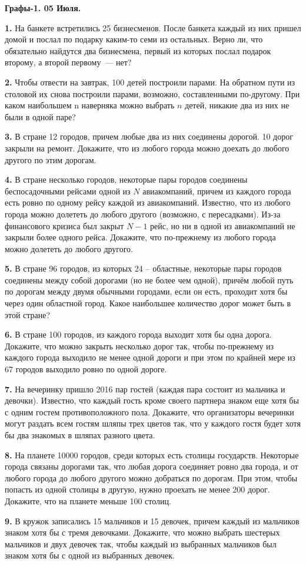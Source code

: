 \begin{center}
\Large

\textbf{Графы-1. 05 Июля.}
\end{center}  

\large
\def\q#1.{{\smallskip\bf #1.}}

\q1. На банкете встретились 25 бизнесменов. После банкета каждый из
них пришел домой и послал по подарку каким-то семи из остальных.
Верно ли, что обязательно найдутся два бизнесмена, первый из которых
послал подарок второму, а второй первому~--- нет?


\q2. Чтобы отвести на завтрак, 100 детей построили парами. На обратном 
пути из столовой их снова построили парами, возможно, составленными по-другому. 
При каком наибольшем n наверняка можно выбрать $n$ 
детей, никакие два из них не были в одной паре?

\q3. В стране 12 городов, причем любые два из них соединены дорогой.
10 дорог закрыли на ремонт. Докажите, что из любого города можно
доехать до любого другого по этим дорогам.

\q4. В стране несколько городов, некоторые пары городов соединены
беспосадочными рейсами одной из $N$ авиакомпаний, причем из каждого
города есть ровно по одному рейсу каждой из авиакомпаний. Известно,
что из любого города можно долететь до любого другого (возможно, с
пересадками). Из-за финансового кризиса был закрыт $N-1$ рейс,  но
ни в одной из авиакомпаний не закрыли более одного рейса. Докажите,
что по-прежнему из любого города можно долететь до любого другого.

\q5. В стране 96 городов, из которых 24 -- областные, некоторые пары
городов соединены между собой дорогами (но не более чем одной),
причём любой путь по дорогам между двумя обычными городами, если он
есть, проходит хотя бы через один областной город. Какое наибольшее
количество дорог может быть в этой стране?

\q6. В стране 100 городов, из каждого города выходит хотя бы одна
дорога. Докажите, что можно закрыть несколько дорог так, чтобы
по-прежнему из каждого города выходило не менее одной дороги и при
этом по крайней мере из 67 городов выходило ровно по одной дороге.



\q7. На вечеринку пришло 2016 пар гостей (каждая пара состоит из
мальчика и девочки). Известно, что каждый гость кроме своего
партнера знаком еще хотя бы с одним гостем противоположного пола.
Докажите, что организаторы вечеринки могут раздать всем гостям шляпы
трех цветов так, что у каждого гостя будет хотя бы два знакомых в
шляпах разного цвета.

\q8. На планете 10000 городов, среди которых есть столицы
государств. Некоторые города связаны дорогами так, что любая дорога
соединяет ровно два города, и от любого города до любого другого
можно добраться по дорогам. При этом, чтобы попасть из одной столицы
в другую, нужно проехать не менее 200 дорог. Докажите, что на
планете меньше 100 столиц.

\q9. В кружок записались 15 мальчиков и 15 девочек, причем каждый из
мальчиков знаком хотя бы с тремя девочками. Докажите, что можно
выбрать шестерых мальчиков и двух девочек так, чтобы каждый из
выбранных мальчиков был знаком хотя бы с одной из выбранных девочек.
